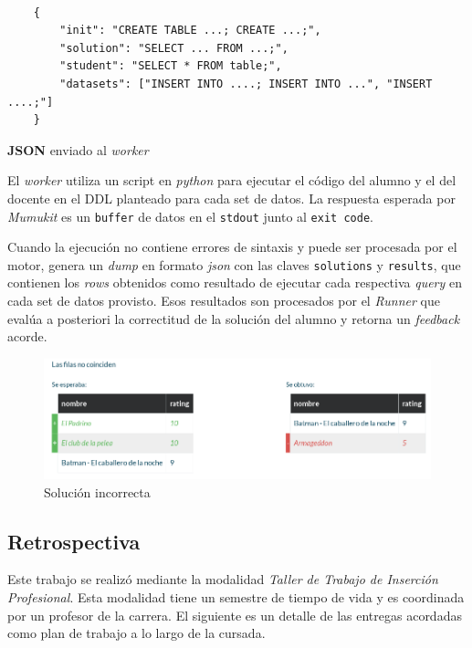 \begin{listing}[ht]
    \begin{verbatim}

    {
        "init": "CREATE TABLE ...; CREATE ...;",
        "solution": "SELECT ... FROM ...;",
        "student": "SELECT * FROM table;",
        "datasets": ["INSERT INTO ....; INSERT INTO ...", "INSERT ....;"]
    }
    \end{verbatim}
    \caption{\textbf{JSON} enviado al \textit{worker}}
    \label{listing:yaml}
\end{listing}

El \textit{worker} utiliza un script en \textit{python}
para ejecutar el código del alumno y el del docente
en el DDL planteado para cada set de datos.
La respuesta esperada por \textit{Mumukit} es un \texttt{buffer}
de datos en el \texttt{stdout} junto al \texttt{exit code}.

Cuando la ejecución no contiene errores de sintaxis
y puede ser procesada por el motor, genera un \textit{dump} en formato \textit{json}
con las claves \texttt{solutions} y \texttt{results},
que contienen los \textit{rows} obtenidos como resultado de ejecutar
cada respectiva \textit{query} en cada set de datos provisto.
Esos resultados son procesados por el \textit{Runner} que evalúa
a posteriori la correctitud de la solución del alumno y
retorna un \textit{feedback} acorde.


\begin{figure}[h]
  \centering
  \includegraphics[width=\textwidth]{img/rows-error}
  \caption{Solución incorrecta}
  \label{fig:rows-error}
\end{figure}


\subsection{Retrospectiva}

Este trabajo se realizó mediante la modalidad
\textit{Taller de Trabajo de Inserción Profesional}.
Esta modalidad tiene un semestre de tiempo de vida
y es coordinada por un profesor de la carrera.
El siguiente es un detalle de las entregas acordadas
como plan de trabajo a lo largo de la cursada.

